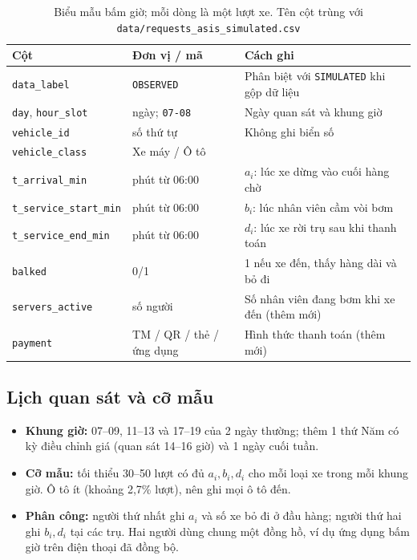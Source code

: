 \begin{table}[htbp]\centering\small
\caption{Biểu mẫu bấm giờ; mỗi dòng là một lượt xe. Tên cột trùng với \texttt{data/requests\_asis\_simulated.csv}}
\label{r2:form}
\begin{tabularx}{\linewidth}{@{}p{39mm}p{24mm}Y@{}}
\toprule
Cột & Đơn vị / mã & Cách ghi \\
\midrule
\texttt{data\_label} & \texttt{OBSERVED} & Phân biệt với \texttt{SIMULATED} khi gộp dữ liệu \\
\texttt{day}, \texttt{hour\_slot} & ngày; \texttt{07-08} & Ngày quan sát và khung giờ \\
\texttt{vehicle\_id} & số thứ tự & Không ghi biển số \\
\texttt{vehicle\_class} & Xe máy / Ô tô & \\
\texttt{t\_arrival\_min} & phút từ 06:00 & $a_i$: lúc xe dừng vào cuối hàng chờ \\
\texttt{t\_service\_start\_min} & phút từ 06:00 & $b_i$: lúc nhân viên cầm vòi bơm \\
\texttt{t\_service\_end\_min} & phút từ 06:00 & $d_i$: lúc xe rời trụ sau khi thanh toán \\
\texttt{balked} & 0/1 & 1 nếu xe đến, thấy hàng dài và bỏ đi \\
\texttt{servers\_active} & số người & Số nhân viên đang bơm khi xe đến (thêm mới) \\
\texttt{payment} & TM / QR / thẻ / ứng dụng & Hình thức thanh toán (thêm mới) \\
\bottomrule
\end{tabularx}
\end{table}

\subsection{Lịch quan sát và cỡ mẫu}
\begin{itemize}
\item \textbf{Khung giờ:} 07--09, 11--13 và 17--19 của 2 ngày thường; thêm 1 thứ
Năm có kỳ điều chỉnh giá (quan sát 14--16 giờ) và 1 ngày cuối tuần.
\item \textbf{Cỡ mẫu:} tối thiểu 30--50 lượt có đủ $a_i,b_i,d_i$ cho mỗi loại xe
trong mỗi khung giờ. Ô tô ít (khoảng 2,7\% lượt), nên ghi mọi ô tô đến.
\item \textbf{Phân công:} người thứ nhất ghi $a_i$ và số xe bỏ đi ở đầu hàng;
người thứ hai ghi $b_i,d_i$ tại các trụ. Hai người dùng chung một đồng hồ, ví
dụ ứng dụng bấm giờ trên điện thoại đã đồng bộ.
\end{itemize}

